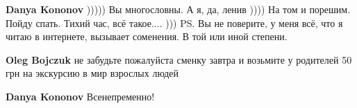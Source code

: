 \begin{itemize}
\begin{itemize}
\textbf{Danya Kononov} ))))) Вы многословны. А я, да, ленив )))) На том и порешим. Пойду спать. Тихий час, всё такое.... )))
PS. Вы не поверите, у меня всё, что я читаю в интернете, вызывает соменения. В той или иной степени.

 
\textbf{Oleg Bojczuk} не забудьте пожалуйста сменку завтра и возьмите у родителей 50 грн на экскурсию в мир взрослых людей

 
\textbf{Danya Kononov} Всенепременно! \Smiley[1.0][yellow]

\end{itemize}



\end{itemize}

